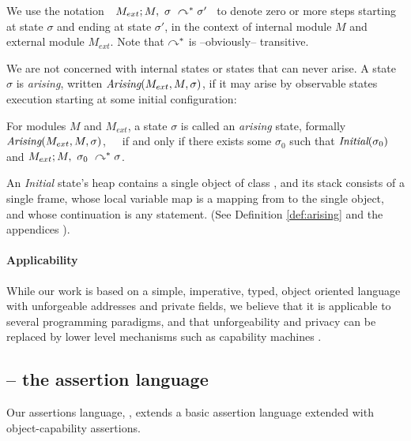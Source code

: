 We  use the notation\ \  $M_{ext} ; M,\ \sigma\ \curvearrowright^* \sigma'$ \ 
to denote zero or more  steps starting at state $\sigma$ and ending at state $\sigma'$, in the context of internal module 
$M$ and external module $M_{ext}$.
 Note that $\curvearrowright^*$ is --obviously-- transitive.
 
We are {not} concerned with internal states or states that can never arise.
{A state $\sigma$ is \emph{arising},}  written $\textit{Arising}(M_{ext}, M, \sigma)$, {if it  may arise by observable states} execution
starting at some initial configuration:



\begin{definition}
\label{def:arising}
For   modules $M$ and  $M_{ext}$, a %
 state $\sigma$ is 
called an \emph{arising} state, formally \ \ \ $\textit{Arising}(M_{ext}, M, \sigma)$,\ \ \ 
if and only if there exists some $\sigma_0$ such that $\textit{Initial}(\sigma_0)$ and
$M_{ext} ; M,\ \sigma_0\ \curvearrowright^* \sigma$.
\end{definition}

An \emph{Initial} state's heap contains a single object of class , and
its  stack   consists of a single frame, whose local variable map is a
mapping from \prg{this} to the single object, and whose continuation is  any statement.
(See Definition %
\ref{def:arising} and the 
{appendices %
\cite{necessityFull}).}


\paragraph{Applicability} 
{While our work is based on 
  a simple, imperative, typed, object oriented}
language with unforgeable addresses and private fields, we believe
 that %
 it is applicable to several programming paradigms, and 
 that   unforgeability and privacy
 can be replaced 
 by lower level mechanisms such as capability machines \cite{vanproving,davis2019cheriabi}.

\subsection{\AssertLang -- the assertion language}
\label{sub:SpecO}

Our assertions language, \AssertLang, extends a 
 basic assertion language extended with
object-capability assertions. 


